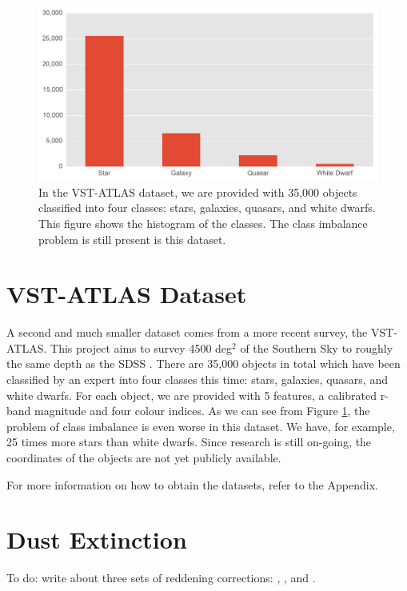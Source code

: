 \begin{figure}[tbp]
	\centering
	\includegraphics[width=\textwidth]{figures/bar_vstatlas_class_distribution}
	\caption[Histogram of the labelled objects in the VST-ATLAS]{In the VST-ATLAS dataset,
		we are provided with 35,000 objects classified into four classes: stars, galaxies,
		quasars, and white dwarfs. This figure shows the histogram of the classes.
		The class imbalance problem is still present is this dataset.}
	\label{fig:class_dist_vst}
\end{figure}

\section{VST-ATLAS Dataset}
A second and much smaller dataset comes from a more recent survey, the VST-ATLAS. This project
aims to survey 4500 deg$^2$ of the Southern Sky to roughly the same depth as the SDSS
\cite{shanks15}.
There are 35,000 objects in total which have been classified by an expert into four classes
this time: stars, galaxies, quasars, and white dwarfs. For each object, we are provided
with 5 features, a calibrated r-band magnitude and four colour indices.
As we can see from Figure \ref{fig:class_dist_vst}, the problem of class imbalance is even worse in this dataset. We 
have, for example, 25 times more stars than white dwarfs. Since research is still on-going, 
the coordinates of the objects are not yet publicly available.

For more information on how to obtain the datasets, refer to the Appendix.


\section{Dust Extinction}
To do: write about three sets of reddening corrections: \cite{schlegel98}, \cite{schlafly11},
and \cite{wolf14}.


